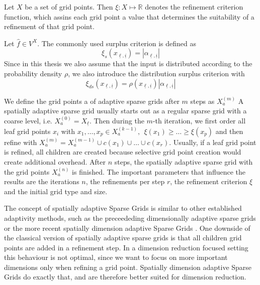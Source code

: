 \documentclass[
  a4paper,  %
  twoside,  %
  bibliography=totoc,
  headsepline,
  cleardoublepage=empty,
  parskip=half,
  draft=false
]{scrbook}
\begin{document}
\begin{definition}
Let $X$ be a set of grid points.
Then $\xi \colon X \mapsto \mathds{R}$ denotes the refinement criterion function, which assins each grid point a value that determines the suitability of a refinement of that grid point.

Let $\hat{f} \in V^X$.
The commonly used surplus criterion is defined as
\begin{equation}
\xi_s(x_{\underline{\ell},\underline{i}}) = |\alpha_{\underline{\ell},\underline{i}}|
\end{equation}
Since in this thesis we also assume that the input is distributed according to the probability density $\rho$, we also introduce the distribution surplus criterion with
\begin{equation}
\xi_{ds}(x_{\underline{\ell},\underline{i}}) =\rho(x_{\underline{\ell},\underline{i}}) |\alpha_{\underline{\ell},\underline{i}}|
\end{equation}
\end{definition}
We define the grid points a of adaptive sparse grids after $m$ steps as $X_a^{(m)}$
A spatially adaptive sparse grid usually starts out as a regular sparse grid with a coarse level, i.e. $X_a^{(0)}=X_{\underline{\ell}}$.
Then during the $m$-th iteration, we first order all leaf grid points $x_i$ with $x_1, \dots, x_p \in X_a^{(k-1)}, ~~ \xi(x_1) \geq \dots \geq \xi(x_p)$ and then refine with $X_a^{(m)}=X_a^{(m-1)} \cup c(x_1) \cup \dots \cup c(x_r)$.
Usually, if a leaf grid point is refined, all children are created because selective grid point creation would create additional overhead.
After $n$ steps, the spatially adaptive sparse grid with the grid points $X_a^{(n)}$ is finished.
The important parameters that influence the results are the iterations $n$, the refinements per step $r$, the refinement criterion $\xi$ and the initial grid type and size.

The concept of spatially adaptive Sparse Grids is similar to other established adaptivity methods, such as the preceededing dimensionally adaptive sparse grids \cite{} or the more recent spatially dimension adaptive Sparse Grids \cite{}.
One downside of the classical version of spatially adaptive sparse grids is that all children grid points are added in a refinement step.
In a dimension reduction focused setting this behaviour is not optimal, since we want to focus on more important dimensions only when refining a grid point.
Spatially dimension adaptive Sparse Grids do exactly that, and are therefore better suited for dimension reduction.
\end{document}
